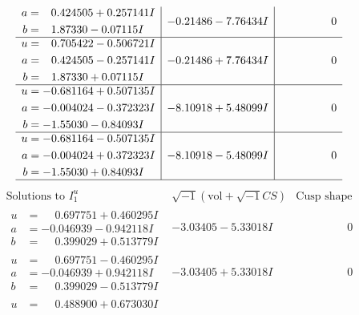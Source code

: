 \documentclass[1p]{elsarticle_modified}
\theoremstyle{definition}
\newcommand{\I}{\sqrt{-1}}
\begin{document}
$$\begin{array}{c|c|c}
\begin{aligned}
a &= \phantom{-}0.424505 + 0.257141 I \\
b &= \phantom{-}1.87330 - 0.07115 I\end{aligned}
 & -0.21486 - 7.76434 I & \phantom{-0.000000 } 0 \\ \hline\begin{aligned}
u &= \phantom{-}0.705422 - 0.506721 I \\
a &= \phantom{-}0.424505 - 0.257141 I \\
b &= \phantom{-}1.87330 + 0.07115 I\end{aligned}
 & -0.21486 + 7.76434 I & \phantom{-0.000000 } 0 \\ \hline\begin{aligned}
u &= -0.681164 + 0.507135 I \\
a &= -0.004024 - 0.372323 I \\
b &= -1.55030 - 0.84093 I\end{aligned}
 & -8.10918 + 5.48099 I & \phantom{-0.000000 } 0 \\ \hline\begin{aligned}
u &= -0.681164 - 0.507135 I \\
a &= -0.004024 + 0.372323 I \\
b &= -1.55030 + 0.84093 I\end{aligned}
 & -8.10918 - 5.48099 I & \phantom{-0.000000 } 0\\
 \hline 
 \end{array}$$\newpage$$\begin{array}{c|c|c}  
\text{Solutions to }I^u_{1}& \I (\text{vol} + \sqrt{-1}CS) & \text{Cusp shape}\\
 \hline 
\begin{aligned}
u &= \phantom{-}0.697751 + 0.460295 I \\
a &= -0.046939 - 0.942118 I \\
b &= \phantom{-}0.399029 + 0.513779 I\end{aligned}
 & -3.03405 - 5.33018 I & \phantom{-0.000000 } 0 \\ \hline\begin{aligned}
u &= \phantom{-}0.697751 - 0.460295 I \\
a &= -0.046939 + 0.942118 I \\
b &= \phantom{-}0.399029 - 0.513779 I\end{aligned}
 & -3.03405 + 5.33018 I & \phantom{-0.000000 } 0 \\ \hline\begin{aligned}
u &= \phantom{-}0.488900 + 0.673030 I \\

\end{aligned}
\end{array}$$
\end{document}
